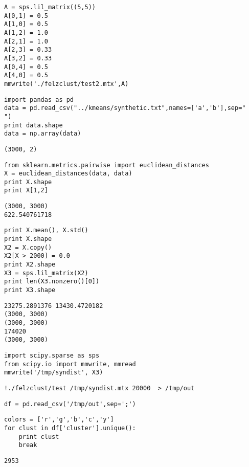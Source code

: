 \documentclass[12pt,fleqn]{article}\usepackage{../common}
\begin{document}
\begin{verbatim}
A = sps.lil_matrix((5,5))
A[0,1] = 0.5
A[1,0] = 0.5
A[1,2] = 1.0
A[2,1] = 1.0
A[2,3] = 0.33
A[3,2] = 0.33
A[0,4] = 0.5
A[4,0] = 0.5
mmwrite('./felzclust/test2.mtx',A)
\end{verbatim}

\begin{verbatim}
import pandas as pd
data = pd.read_csv("../kmeans/synthetic.txt",names=['a','b'],sep="   ")
print data.shape
data = np.array(data)
\end{verbatim}

\begin{verbatim}
(3000, 2)
\end{verbatim}

\begin{verbatim}
from sklearn.metrics.pairwise import euclidean_distances
X = euclidean_distances(data, data)
print X.shape
print X[1,2]
\end{verbatim}

\begin{verbatim}
(3000, 3000)
622.540761718
\end{verbatim}

\begin{verbatim}
print X.mean(), X.std()
print X.shape
X2 = X.copy()
X2[X > 2000] = 0.0
print X2.shape
X3 = sps.lil_matrix(X2)
print len(X3.nonzero()[0])
print X3.shape
\end{verbatim}

\begin{verbatim}
23275.2891376 13430.4720182
(3000, 3000)
(3000, 3000)
174020
(3000, 3000)
\end{verbatim}

\begin{verbatim}
import scipy.sparse as sps
from scipy.io import mmwrite, mmread
mmwrite('/tmp/syndist', X3)
\end{verbatim}


\begin{verbatim}
!./felzclust/test /tmp/syndist.mtx 20000  > /tmp/out
\end{verbatim}

\begin{verbatim}
df = pd.read_csv('/tmp/out',sep=';')
\end{verbatim}

\begin{verbatim}
colors = ['r','g','b','c','y']
for clust in df['cluster'].unique():
    print clust
    break
\end{verbatim}

\begin{verbatim}
2953
\end{verbatim}
\end{document}
